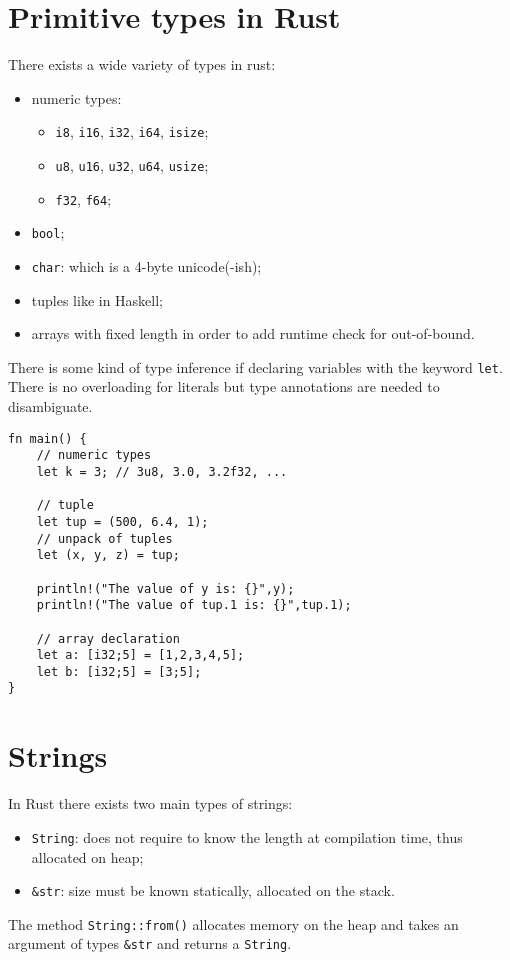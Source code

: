 \section{Primitive types in Rust}
There exists a wide variety of types in rust:
\begin{itemize}
    \item numeric types:
    \begin{itemize}
        \item \verb|i8|, \verb|i16|, \verb|i32|, \verb|i64|, \verb|isize|;
        \item \verb|u8|, \verb|u16|, \verb|u32|, \verb|u64|, \verb|usize|;
        \item \verb|f32|, \verb|f64|;
    \end{itemize}
    \item \verb|bool|;
    \item \verb|char|: which is a 4-byte unicode(-ish);
    \item tuples like in Haskell;
    \item arrays with fixed length in order to add runtime check for out-of-bound.
\end{itemize}
There is some kind of type inference if declaring variables with the keyword \verb|let|.
There is no overloading for literals but type annotations are needed to disambiguate.

\begin{verbatim}
fn main() {
    // numeric types
    let k = 3; // 3u8, 3.0, 3.2f32, ...

    // tuple
    let tup = (500, 6.4, 1);
    // unpack of tuples
    let (x, y, z) = tup;

    println!("The value of y is: {}",y);
    println!("The value of tup.1 is: {}",tup.1);

    // array declaration
    let a: [i32;5] = [1,2,3,4,5];
    let b: [i32;5] = [3;5];
}
\end{verbatim}


\section{Strings}
In Rust there exists two main types of strings:
\begin{itemize}
    \item \verb|String|: does not require to know the length at compilation time, thus allocated on heap;

    \item \verb|&str|: size must be known statically, allocated on the stack.
\end{itemize}
The method \verb|String::from()| allocates memory on the heap and takes an argument of types \verb|&str| and returns a \verb|String|.


